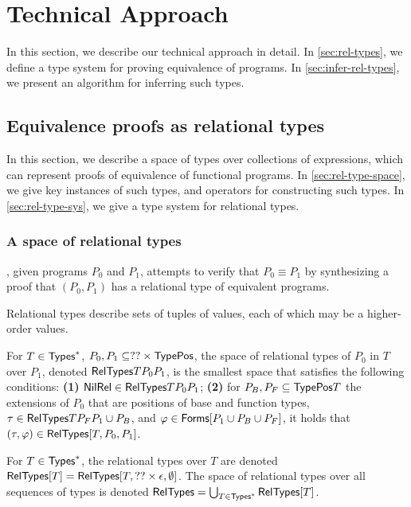 \section{Technical Approach}
%
In this section, we describe our technical approach in detail.
%
In \autoref{sec:rel-types}, we define a type system for proving
equivalence of programs.
%
In \autoref{sec:infer-rel-types}, we present an algorithm for
inferring such types.

\subsection{Equivalence proofs as relational types}
\label{sec:rel-types}
%
In this section, we describe a space of types over collections of
expressions, which can represent proofs of equivalence of functional
programs.
%
In \autoref{sec:rel-type-space}, we give key instances of such types,
and operators for constructing such types.
%
In \autoref{sec:rel-type-sys}, we give a type system for relational
types.

\subsubsection{A space of relational types}
\label{sec:rel-type-space}
%
\sys, given programs $P_0$ and $P_1$, attempts to verify that $P_0
\equiv P_1$ by synthesizing a proof that $(P_0, P_1)$ has a relational
type of equivalent programs.

Relational types describe sets of tuples of values, each of which may
be a higher-order values.
%
%
\begin{defn}
  \label{defn:rel-type}
  For $T \in \mathsf{Types}^{*}$, $P_0, P_1 \subseteq ?? \times \mathsf{TypePos}$, the
  space of relational types of $P_0$ in $T$ over $P_1$, denoted
  $\mathsf{RelTypes}{ T }{ P_0 }{ P_1 }$, is the smallest space that satisfies
  the following conditions:
  \textbf{(1)} $\mathsf{NilRel} \in \mathsf{RelTypes}{ T }{ P_0 }{ P_1 }$;
  \textbf{(2)} for $P_B, P_F \subseteq \mathsf{TypePos}{ T }$ the extensions
  of $P_0$ that are positions of base and function types, %
  $\tau \in \mathsf{RelTypes}{ T }{ P_F }{ P_1 \cup P_B }$, and %
  $\varphi \in \mathsf{Forms}[  P_1 \cup P_B \cup P_F  ]$, it holds that
  $(\tau, \varphi) \in \mathsf{RelTypes}[  T ,  P_0 ,  P_1  ]$.
\end{defn}
%
For $T \in \mathsf{Types}^{*}$, the relational types over $T$ are denoted
$\mathsf{RelTypes}[  T  ] = \mathsf{RelTypes}[  T ,  ?? \times \epsilon , 
  \emptyset  ]$.
%
%
The space of relational types over all sequences of types is denoted
$\mathsf{RelTypes} = \bigcup_{T \in \mathsf{Types}^{*} } \mathsf{RelTypes}[ T ]$.

